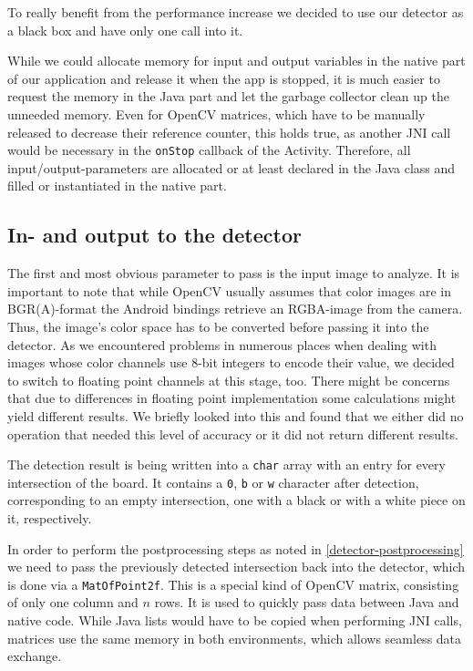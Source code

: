 	To really benefit from the performance increase we decided to use our detector as a black box and have only one call into it.

	While we could allocate memory for input and output variables in the native part of our application and release it when the app is stopped, it is much easier to request the memory in the Java part and let the garbage collector clean up the unneeded memory. Even for OpenCV matrices, which have to be manually released to decrease their reference counter, this holds true, as another JNI call would be necessary in the \texttt{onStop} callback of the Activity. Therefore, all input/output-parameters are allocated or at least declared in the Java class and filled or instantiated in the native part.

	\subsection{In- and output to the detector}
	\label{android-detector-inoutput}
	The first and most obvious parameter to pass is the input image to analyze. It is important to note that while OpenCV usually assumes that color images are in BGR(A)-format the Android bindings retrieve an RGBA-image from the camera. Thus, the image's color space has to be converted before passing it into the detector. As we encountered problems in numerous places when dealing with images whose color channels use 8-bit integers to encode their value, we decided to switch to floating point channels at this stage, too. There might be concerns that due to differences in floating point implementation some calculations might yield different results. We briefly looked into this and found that we either did no operation that needed this level of accuracy or it did not return different results.

	The detection result is being written into a \texttt{char} array with an entry for every intersection of the board. It contains a \texttt{0}, \texttt{b} or \texttt{w} character after detection, corresponding to an empty intersection, one with a black or with a white piece on it, respectively.

	In order to perform the postprocessing steps as noted in \autoref{detector-postprocessing} we need to pass the previously detected intersection back into the detector, which is done via a \texttt{MatOfPoint2f}. This is a special kind of OpenCV matrix, consisting of only one column and $n$ rows. It is used to quickly pass data between Java and native code. While Java lists would have to be copied when performing JNI calls, matrices use the same memory in both environments, which allows seamless data exchange.

